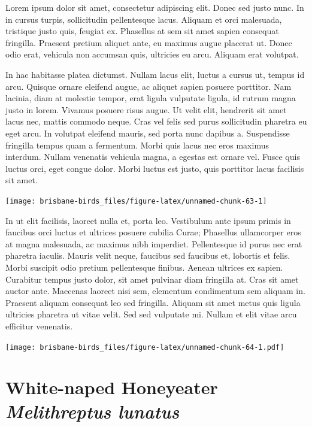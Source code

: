 \documentclass[]{book}
\let\origfigure\figure
\let\endorigfigure\endfigure
\renewenvironment{figure}[1][2] {
  \expandafter\origfigure\expandafter[H]
} {
  \endorigfigure
}
\begin{document}
Lorem ipsum dolor sit amet, consectetur adipiscing elit. Donec sed justo
nunc. In in cursus turpis, sollicitudin pellentesque lacus. Aliquam et
orci malesuada, tristique justo quis, feugiat ex. Phasellus at sem sit
amet sapien consequat fringilla. Praesent pretium aliquet ante, eu
maximus augue placerat ut. Donec odio erat, vehicula non accumsan quis,
ultricies eu arcu. Aliquam erat volutpat.

In hac habitasse platea dictumst. Nullam lacus elit, luctus a cursus ut,
tempus id arcu. Quisque ornare eleifend augue, ac aliquet sapien posuere
porttitor. Nam lacinia, diam at molestie tempor, erat ligula vulputate
ligula, id rutrum magna justo in lorem. Vivamus posuere risus augue. Ut
velit elit, hendrerit sit amet lacus nec, mattis commodo neque. Cras vel
felis sed purus sollicitudin pharetra eu eget arcu. In volutpat eleifend
mauris, sed porta nunc dapibus a. Suspendisse fringilla tempus quam a
fermentum. Morbi quis lacus nec eros maximus interdum. Nullam venenatis
vehicula magna, a egestas est ornare vel. Fusce quis luctus orci, eget
congue dolor. Morbi luctus est justo, quis porttitor lacus facilisis sit
amet.

\begin{figure}
\texttt{[image: brisbane-birds\_files/figure-latex/unnamed-chunk-63-1]} \caption{insert figure caption}\label{fig:unnamed-chunk-63}
\end{figure}

In ut elit facilisis, laoreet nulla et, porta leo. Vestibulum ante ipsum
primis in faucibus orci luctus et ultrices posuere cubilia Curae;
Phasellus ullamcorper eros at magna malesuada, ac maximus nibh
imperdiet. Pellentesque id purus nec erat pharetra iaculis. Mauris velit
neque, faucibus sed faucibus et, lobortis et felis. Morbi suscipit odio
pretium pellentesque finibus. Aenean ultrices ex sapien. Curabitur
tempus justo dolor, sit amet pulvinar diam fringilla at. Cras sit amet
auctor ante. Maecenas laoreet nisi sem, elementum condimentum sem
aliquam in. Praesent aliquam consequat leo sed fringilla. Aliquam sit
amet metus quis ligula ultricies pharetra ut vitae velit. Sed sed
vulputate mi. Nullam et elit vitae arcu efficitur venenatis.

\begin{figure}
\centering
\texttt{[image: brisbane-birds\_files/figure-latex/unnamed-chunk-64-1.pdf]}
\caption{\label{fig:unnamed-chunk-64}insert figure caption}
\end{figure}

\section{\texorpdfstring{White-naped Honeyeater \emph{Melithreptus
lunatus}}{White-naped Honeyeater Melithreptus lunatus}}\label{white-naped-honeyeater-melithreptus-lunatus}
\end{document}
